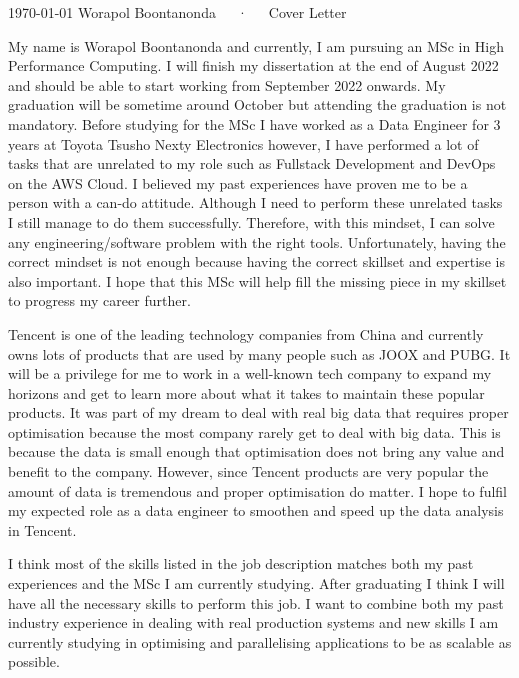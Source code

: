 \documentclass[11pt, a4paper]{awesome-cv}
\begin{document}
\makecvheader[R]

\makecvfooter
  {\today}
  {Worapol Boontanonda~~~·~~~Cover Letter}
  {}

\makelettertitle

\begin{cvletter}

My name is Worapol Boontanonda and currently, I am pursuing an MSc in High Performance Computing.
I will finish my dissertation at the end of August 2022 and should be able to start working from
September 2022 onwards. My graduation will be sometime around October but attending the graduation is not mandatory.
Before studying for the MSc I have worked as a Data Engineer for 3 years at Toyota Tsusho Nexty Electronics 
however, I have performed a lot of tasks that are unrelated to my role such as Fullstack Development 
and DevOps on the AWS Cloud. I believed my past experiences have proven me to be a person 
with a can-do attitude. Although I need to perform these unrelated tasks I still manage to do them successfully. 
Therefore, with this mindset, I can solve any engineering/software problem with the right tools. 
Unfortunately, having the correct mindset is not enough 
because having the correct skillset and expertise is also important. 
I hope that this MSc will help fill the missing piece in my skillset to progress my career further.

Tencent is one of the leading technology companies from China and currently owns lots of products that are used
by many people such as JOOX and PUBG. 
It will be a privilege for me to work in a well-known
tech company to expand my horizons and get to learn more about what it takes to maintain these popular products. 
It was part of my dream to deal with real big data that requires
proper optimisation because the most company rarely get to deal with big data. This is because
the data is small enough that optimisation does not bring any value and benefit to the company. 
However, since Tencent products are very popular the amount of data is tremendous and proper optimisation do matter. 
I hope to fulfil my expected role as a data engineer to smoothen and speed up the data analysis in Tencent.

I think most of the skills listed in the job description matches both my past experiences and the MSc I am currently
studying. After graduating I think I will have all the necessary skills to perform this job. I want to combine
both my past industry experience in dealing with real production systems and new skills I am currently studying 
in optimising and parallelising applications to be as scalable as possible.

\end{cvletter}


\makeletterclosing
\end{document}

